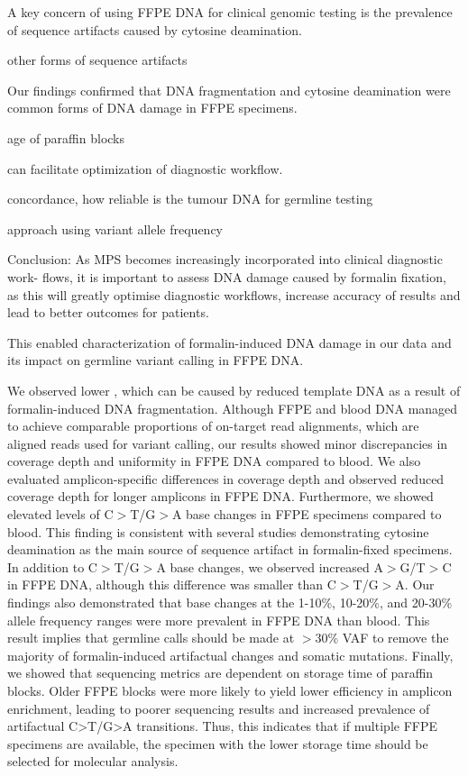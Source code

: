 A key concern of using FFPE DNA for clinical genomic testing is the prevalence of sequence artifacts caused by cytosine deamination.

other forms of sequence artifacts

Our findings confirmed that DNA fragmentation and cytosine deamination were common forms of DNA damage in FFPE specimens.

age of paraffin blocks

can facilitate optimization of diagnostic workflow.

concordance, how reliable is the tumour DNA for germline testing

approach using variant allele frequency

Conclusion: As MPS becomes increasingly incorporated into clinical diagnostic work- flows, it is important to assess DNA damage caused by formalin fixation, as this will greatly optimise diagnostic workflows, increase accuracy of results and lead to better outcomes for patients.

This enabled characterization of formalin-induced DNA damage in our data and its impact on germline variant calling in FFPE DNA.

We observed lower , which can be caused by reduced template DNA as a result of formalin-induced DNA fragmentation. Although FFPE and blood DNA managed to achieve comparable proportions of on-target read alignments, which are aligned reads used for variant calling, our results showed minor discrepancies in coverage depth and uniformity in FFPE DNA compared to blood. We also evaluated amplicon-specific differences in coverage depth and observed reduced coverage depth for longer amplicons in FFPE DNA. Furthermore, we showed elevated levels of C$>$T/G$>$A base changes in FFPE specimens compared to blood. This finding is consistent with several studies demonstrating cytosine deamination as the main source of sequence artifact in formalin-fixed specimens. In addition to C$>$T/G$>$A base changes, we observed increased A$>$G/T$>$C in FFPE DNA, although this difference was smaller than C$>$T/G$>$A. Our findings also demonstrated that base changes at the 1-10\%, 10-20\%, and 20-30\% allele frequency ranges were more prevalent in FFPE DNA than blood. This result implies that germline calls should be made at $>$30\% VAF to remove the majority of formalin-induced artifactual changes and somatic mutations. Finally, we showed that sequencing metrics are dependent on storage time of paraffin blocks. Older FFPE blocks were more likely to yield lower efficiency in amplicon enrichment, leading to poorer sequencing results and increased prevalence of artifactual C>T/G>A transitions. Thus, this indicates that if multiple FFPE specimens are available, the specimen with the lower storage time should be selected for molecular analysis.



